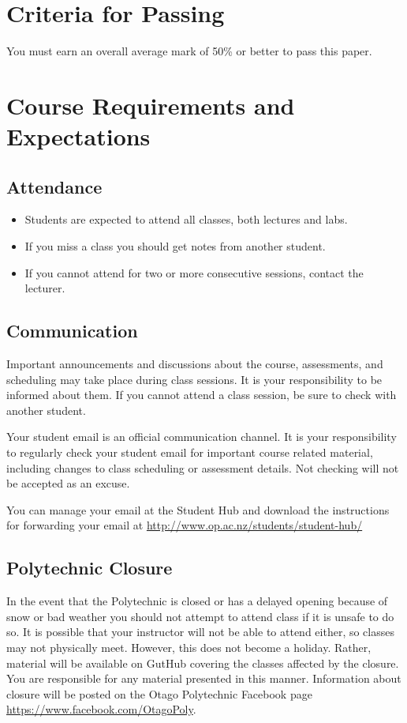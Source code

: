 \documentclass{article}
\begin{document}
\section*{Criteria for Passing}
You must earn an overall average mark of 50\% or better to pass this paper.

\section*{Course Requirements and Expectations}
\subsection*{Attendance}
\begin{itemize}
 \item Students are expected to attend all classes, both lectures and labs.
 \item If you miss a class you should get notes from another student.
 \item If you cannot attend for two or more consecutive sessions, contact the lecturer.
\end{itemize}

\subsection*{Communication}
Important announcements and discussions about the course, assessments, and scheduling may take place during class sessions.  It is your responsibility to be informed about them.  If you cannot attend a class session, be sure to check with another student.

Your student email is an official communication channel. It is your responsibility to regularly check your student email for important course related material, including changes to class scheduling or assessment details. Not checking will not be accepted as an excuse.

You can manage your email at the Student Hub and download the instructions for forwarding your email at \url{http://www.op.ac.nz/students/student-hub/}

\subsection*{Polytechnic Closure}
In the event that the Polytechnic is closed or has a delayed opening because of snow or bad weather you should not attempt to attend class if it is unsafe to do so. It is possible that your instructor will not be able to attend either, so classes may not physically meet. However, this does not become a holiday. Rather, material will be available on GutHub covering the classes affected by the closure. You are responsible for any material presented in this manner. Information about closure will be posted on the Otago Polytechnic Facebook page \url{https://www.facebook.com/OtagoPoly}.
\end{document}

